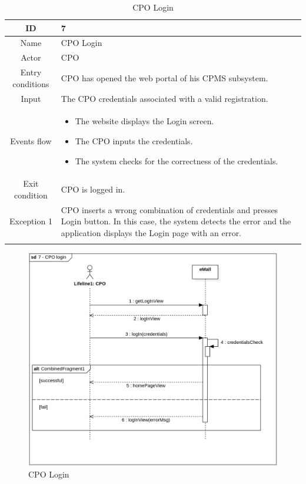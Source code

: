 \begin{longtable}{|c| p{10cm}|}
    \hline ID        & 7\\
    \hline
    Name     & CPO Login \\
    \hline
    Actor            & CPO\\
    \hline 
    Entry conditions & CPO has opened the web portal of his CPMS subsystem.
        \\
    \hline
    Input & The CPO credentials associated with a valid registration.
    \\
    \hline
    Events flow      & \begin{itemize}[nosep,after=\strut]
        \item The website displays the Login screen.
        \item The CPO inputs the credentials.
        \item The system checks for the correctness of the credentials.
        \end{itemize} \\
    \hline
    Exit condition   & CPO is logged in.
    \\
    \hline
    Exception 1      & CPO inserts a wrong combination of credentials and presses Login button. In this case, the system detects the error and the application displays the Login page with an error. \\
    \hline
    \caption{CPO Login}\\
\end{longtable}
\begin{figure}[H]
    \begin{center}
        \includegraphics[width=\textwidth]{img/sequence/login-cpo.png}
        \caption{CPO Login}
    \end{center}
\end{figure}
